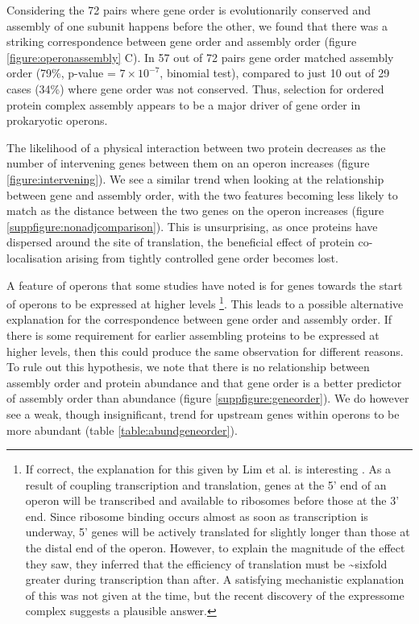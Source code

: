 \documentclass[a4paper,11pt,twoside,openright]{scrbook}
\begin{document}
Considering the 72 pairs where gene order is evolutionarily conserved and assembly of one subunit happens before the other, we found that there was a striking correspondence between gene order and assembly order (figure \ref{figure:operonassembly} C). In 57 out of 72 pairs gene order matched assembly order (79\%, p-value = \(7 \times 10^{-7}\), binomial test), compared to just 10 out of 29 cases (34\%) where gene order was not conserved. Thus, selection for ordered protein complex assembly appears to be a major driver of gene order in prokaryotic operons.

The likelihood of a physical interaction between two protein decreases as the number of intervening genes between them on an operon increases (figure \ref{figure:intervening}). We see a similar trend when looking at the relationship between gene and assembly order, with the two features becoming less likely to match as the distance between the two genes on the operon increases (figure \ref{suppfigure:nonadjcomparison}). This is unsurprising, as once proteins have dispersed around the site of translation, the beneficial effect of protein co-localisation arising from tightly controlled gene order becomes lost.

A feature of operons that some studies have noted is for genes towards the start of operons to be expressed at higher levels \cite{Nishizaki2007,Lim2011} \footnote{If correct, the explanation for this given by Lim et al. is interesting \cite{Lim2011}. As a result of coupling transcription and translation, genes at the 5' end of an operon will be transcribed and available to ribosomes before those at the 3' end. Since ribosome binding occurs almost as soon as transcription is underway, 5' genes will be actively translated for slightly longer than those at the distal end of the operon. However, to explain the magnitude of the effect they saw, they inferred that the efficiency of translation must be \textasciitilde sixfold greater during transcription than after. A satisfying mechanistic explanation of this was not given at the time, but the recent discovery of the expressome complex \cite{Kohler2017} suggests a plausible answer.}. This leads to a possible alternative explanation for the correspondence between gene order and assembly order. If there is some requirement for earlier assembling proteins to be expressed at higher levels, then this could produce the same observation for different reasons. To rule out this hypothesis, we note that there is no relationship between assembly order and protein abundance and that gene order is a better predictor of assembly order than abundance (figure \ref{suppfigure:geneorder}). We do however see a weak, though insignificant, trend for upstream genes within operons to be more abundant (table \ref{table:abundgeneorder}).
\end{document}
